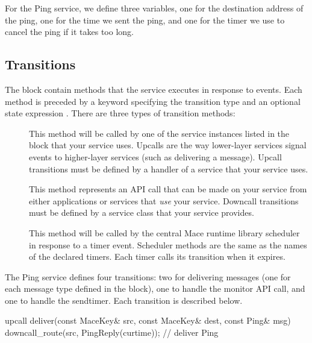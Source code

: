 For the Ping service, we define three variables, one for the
destination address of the ping, one for the time we sent the ping,
and one for the timer we use to cancel the ping if it takes too long.

\subsection{Transitions}
\label{sec:transitions}

The  block contain methods that the service
executes in response to events.  Each method is preceded by a keyword
specifying the transition type and an optional state expression
.  There are three types
of transition methods:

\begin{description}

\item[] This method will be called by one of the
  service instances listed in the  block that your
  service uses.  Upcalls are the way lower-layer services signal
  events to higher-layer services (such as delivering a message).
  Upcall transitions must be defined by a handler of a service that
  your service uses.

\item[] This method represents an API call that can
  be made on your service from either applications or services that
  \emph{use} your service.  Downcall transitions must be defined by a
  service class that your service provides.

\item[] This method will be called by the central
  Mace runtime library scheduler in response to a timer event.
  Scheduler methods are the same as the names of the declared timers.
  Each timer calls its transition when it expires.

\end{description}

The Ping service defines four transitions: two for delivering messages
(one for each message type defined in the  block),
one to handle the monitor API call, and one to handle the sendtimer.
Each transition is described below.


\begin{programlisting}
  upcall deliver(const MaceKey& src, const MaceKey& dest, const Ping& msg) {
    downcall_route(src, PingReply(curtime));
  } // deliver Ping
\end{programlisting}

